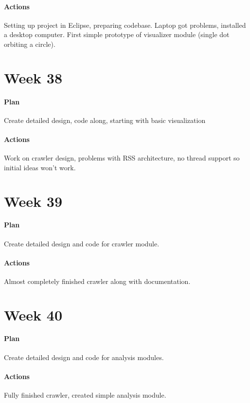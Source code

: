 \paragraph{Actions} Setting up project in Eclipse, preparing codebase. Laptop
got problems, installed a desktop computer. First simple prototype of
visualizer module (single dot orbiting a circle).

\section{Week 38}

\paragraph{Plan} Create detailed design, code along, starting with basic
visualization

\paragraph{Actions} Work on crawler design, problems with RSS architecture, no
thread support so initial ideas won't work.

\section{Week 39}

\paragraph{Plan} Create detailed design and code for crawler module. 

\paragraph{Actions} Almost completely finished crawler along with
documentation.

\section{Week 40}

\paragraph{Plan} Create detailed design and code for analysis modules.

\paragraph{Actions} Fully finished crawler, created simple analysis module.

